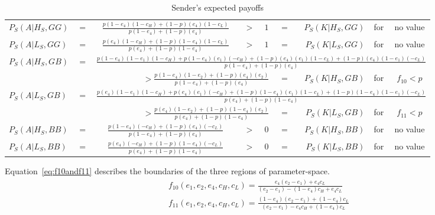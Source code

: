 \documentclass[a4paper,12pt]{article}
\numberwithin{equation}{section}
\begin{document}
\begin{table}[h]
\setlength{\tabcolsep}{.3em}
\begin{center}
\begin{tabular}{lccccrrcc}
$P_{S}(A|H_{S},GG)$ & $=$ & $\frac{p(1-e_{4})(1-c_{H})+(1-p)(e_{4})(1-c_{L})}{p(1-e_{4})+(1-p)(e_{4})}$ & $>$ & $1$ & $=$ & $P_{S}(K|H_{S},GG)$ & for & no value\\
$P_{S}(A|L_{S},GG)$ & $=$ & $\frac{p(e_{4})(1-c_{H})+(1-p)(1-e_{4})(1-c_{L})}{p(e_{4})+(1-p)(1-e_{4})}$ & $>$ & $1$ & $=$ & $P_{S}(K|L_{S},GG)$ & for & no value\\
$P_{S}(A|H_{S},GB)$ & $=$ & \multicolumn{7}{l}{$\frac{p(1-e_{4})(1-e_{1})(1-c_{H})+p(1-e_{4})(e_{1})(-c_{H})+(1-p)(e_{4})(e_{1})(1-c_{L})+(1-p)(e_{4})(1-e_{1})(-c_{L})}{p(1-e_{4})+(1-p)(e_{4})}$}
\vspace{1mm}\\
\multicolumn{5}{r}{$> \frac{p(1-e_{4})(1-e_{2})+(1-p)(e_{4})(e_{2})}{p(1-e_{4})+(1-p)(e_{4})}$} & $=$ & $P_{S}(K|H_{S},GB)$ & for & $f_{10}<p$
\vspace{2mm}\\
$P_{S}(A|L_{S},GB)$ & $=$ & \multicolumn{7}{l}{$\frac{p(e_{4})(1-e_{1})(1-c_{H})+p(e_{4})(e_{1})(-c_{H})+(1-p)(1-e_{4})(e_{1})(1-c_{L})+(1-p)(1-e_{4})(1-e_{1})(-c_{L})}{p(e_{4})+(1-p)(1-e_{4})}$}
\vspace{1mm}\\
\multicolumn{5}{r}{$> \frac{p(e_{4})(1-e_{2})+(1-p)(1-e_{4})(e_{2})}{p(e_{4})+(1-p)(1-e_{4})}$} & $=$ & $P_{S}(K|L_{S},GB)$ & for & $f_{11}<p$
\vspace{2mm}\\
$P_{S}(A|H_{S},BB)$ & $=$ & $\frac{p(1-e_{4})(-c_{H})+(1-p)(e_{4})(-c_{L})}{p(1-e_{4})+(1-p)(e_{4})}$ & $>$ & $0$ & $=$ & $P_{S}(K|H_{S},BB)$ & for & no value\\
$P_{S}(A|L_{S},BB)$ & $=$ & $\frac{p(e_{4})(-c_{H})+(1-p)(1-e_{4})(-c_{L})}{p(e_{4})+(1-p)(1-e_{4})}$ & $>$ & $0$ & $=$ & $P_{S}(K|L_{S},BB)$ & for & no value
\end{tabular}
\end{center}
\caption{Sender's expected payoffs}
\label{tab:Appendix/Cue Game with Conditional Amplification/ConditionalPayoffsS}
\end{table}

Equation~\ref{eq:f10andf11} describes the boundaries of the three regions of parameter-space.
\begin{subequations}
\label{eq:f10andf11}
\begin{gather}
f_{10}(e_{1},e_{2},e_{4},c_{H},c_{L})=\frac{e_{4}(e_{2}-e_{1})+e_{4}c_{L}}{(e_{2}-e_{1})-(1-e_{4})c_{H}+e_{4}c_{L}}\\
f_{11}(e_{1},e_{2},e_{4},c_{H},c_{L})=\frac{(1-e_{4})(e_{2}-e_{1})+(1-e_{4})c_{L}}{(e_{2}-e_{1})-e_{4}c_{H}+(1-e_{4})c_{L}}
\end{gather}
\end{subequations}
\end{document}
